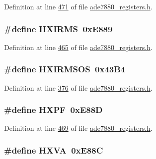Definition at line \hyperlink{a00036_source_l00471}{471} of file \hyperlink{a00036_source}{ade7880\-\_\-registers.\-h}.

\hypertarget{a00036_a46e6200d5a1ec07a23be9dfce8ac7f60}{
\subsubsection[{H\-X\-I\-R\-M\-S}]{\setlength{\rightskip}{0pt plus 5cm}\#define H\-X\-I\-R\-M\-S~0x\-E889}}\label{de/d8c/a00036_a46e6200d5a1ec07a23be9dfce8ac7f60}


Definition at line \hyperlink{a00036_source_l00465}{465} of file \hyperlink{a00036_source}{ade7880\-\_\-registers.\-h}.

\hypertarget{a00036_a0393132c56cc12af538a79b7ad01f4f3}{
\subsubsection[{H\-X\-I\-R\-M\-S\-O\-S}]{\setlength{\rightskip}{0pt plus 5cm}\#define H\-X\-I\-R\-M\-S\-O\-S~0x43\-B4}}\label{de/d8c/a00036_a0393132c56cc12af538a79b7ad01f4f3}


Definition at line \hyperlink{a00036_source_l00376}{376} of file \hyperlink{a00036_source}{ade7880\-\_\-registers.\-h}.

\hypertarget{a00036_a3059705ef55e2b519c1872600621b9f8}{
\subsubsection[{H\-X\-P\-F}]{\setlength{\rightskip}{0pt plus 5cm}\#define H\-X\-P\-F~0x\-E88\-D}}\label{de/d8c/a00036_a3059705ef55e2b519c1872600621b9f8}


Definition at line \hyperlink{a00036_source_l00469}{469} of file \hyperlink{a00036_source}{ade7880\-\_\-registers.\-h}.

\hypertarget{a00036_acfd250a61a5d7421cdbc541f94ce5ae4}{
\subsubsection[{H\-X\-V\-A}]{\setlength{\rightskip}{0pt plus 5cm}\#define H\-X\-V\-A~0x\-E88\-C}}\label{de/d8c/a00036_acfd250a61a5d7421cdbc541f94ce5ae4}


